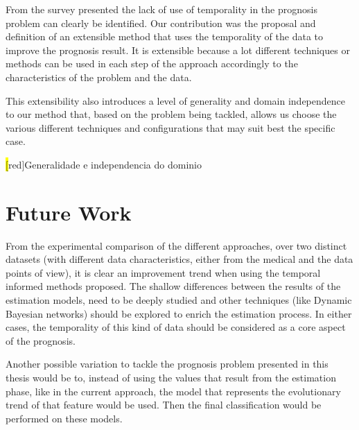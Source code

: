 From the survey presented the lack of use of temporality in the prognosis problem can clearly be identified. 
Our contribution was the proposal and definition of an extensible method that uses the temporality of the data to improve the prognosis result. It is extensible because a lot different techniques or methods can be used in each step of the approach accordingly to the characteristics of the problem and the data.

This extensibility also introduces a level of generality and domain independence to our method that, based on the problem being tackled, allows us choose the various different techniques and configurations that may suit best the specific case. 


\hl[red]{Generalidade e independencia do dominio}


\section{Future Work}
\label{section:future}

From the experimental comparison of the different approaches, over two distinct datasets (with different data characteristics,
 either from the medical and the data points of view), it is clear an improvement trend when using the temporal informed
 methods proposed. The shallow differences between the results of the estimation models, need to be deeply studied and other
 techniques (like Dynamic Bayesian networks) should be explored to enrich the estimation process. In either cases,
 the temporality of this kind of data should be considered as a core aspect of the prognosis.
 
Another possible variation to tackle the prognosis problem presented in this thesis would be to, instead of using the 
values that result from the estimation phase, like in the current approach, the model that represents the evolutionary trend of that
 feature would be used. Then the final classification would be performed on these models.

\cleardoublepage


